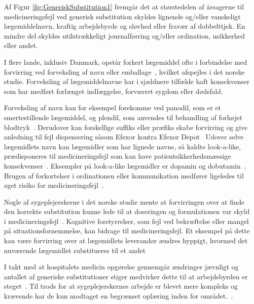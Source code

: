 Af Figur \ref{fig:GeneriskSubstitution1} fremgår det at størstedelen af årsagerne til medicineringsfejl ved generisk substitution skyldes lignende og/eller vanskeligt lægemiddelnavn, kraftig arbejdsbyrde og sløvhed eller fravær af dobbelttjek. En mindre del skyldes utilstrækkeligt journalførring og/eller ordination, usikkerhed eller andet. 

I flere lande, inklusiv Danmark, opstår forkert lægemiddel ofte i forbindelse med forvirring ved forveksling af navn eller emballage~\citep{DanskSelskabforPatientsikkerhed2009}, hvilket afspejles i det norske studie. Forveksling af lægemiddelnavne har i sjældnere tilfælde haft konsekvenser som har medført forlænget indlæggelse, forværret sygdom eller dødsfald.~\citep{DanskSelskabforPatientsikkerhed2009}

Forveksling af navn kan for eksempel forekomme ved panodil, som er et smertestillende lægemiddel, og plendil, som anvendes til behandling af forhøjet blodtryk~\citep{DanskSelskabforPatientsikkerhed2009}. Derudover kan forskellige suffiks eller præfiks skabe forvirring og give anledning til fejl dispensering såsom Efexor kontra Efexor Depot~\citep{DanskSelskabforPatientsikkerhed2009} Udover selve lægemidlets navn kan lægemidler som har lignede navne, så kaldte look-a-like, prædisponeres til medicineringsfejl som kan have patientsikkerhedsmæssige konsekvenser~\citep{Wittich2014}. Eksempler på look-a-like lægemidler er  dopamin og dobutamin~\citep{Wittich2014}. Brugen af forkortelser i ordinationen eller kommunikation medfører ligeledes til øget risiko for medicineringsfejl~\citep{Wittich2014}.

Nogle af sygeplejerskerne i det norske studie mente at forvirringen over at finde den korrekte substitution kunne lede til at doseringen og formulationen var skyld i medicineringsfejl~\citep{Hakonsen2010}. Kognitive forstyrrelser, som fejl ved bekræftelse eller mangel på situationsfornemmelse, kan bidrage til medicineringsfejl. Et eksempel på dette kan være forvirring over at lægemidlets leverandør ændres hyppigt, hvormed det nuværende lægemidlet substitueres til et andet~\citep{Wittich2014}

I takt med at hospitalets medicin opgørelse gennemgår ændringer jævnligt og antallet af generiske substitutioner stiger medvirker dette til at arbejdsbyrden er steget~\citep{Hakonsen2010}. Til trods for at sygeplejerskernes arbejde er blevet mere kompleks og krævende har de kun modtaget en begrænset oplæring inden for området.~\citep{Hakonsen2010}.

